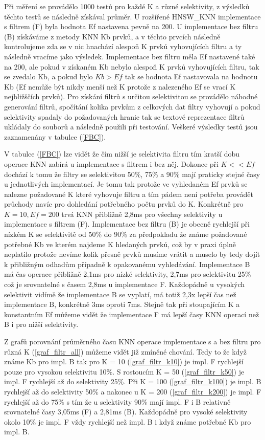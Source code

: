 \documentclass[czech,semestral,dept460,male,csharp,cpdeclaration]{diploma}
\begin{document}
		Při měření se provádělo 1000 testů pro každé K a různé selektivity, z výsledků těchto testů se následně získával průměr. U rozšířené HNSW\_KNN implementace s filtrem (F) byla hodnota Ef nastavena pevně na 200. U implementace bez filtru (B) získáváme z metody KNN Kb prvků, a v těchto prvcích následně kontrolujeme zda se v nic hnachází alespoň K prvků vyhovujících filtru a ty následně vracíme jako výsledek. Implementace bez filtru měla Ef nastavené také na 200, ale pokud v získaném Kb nebylo alespoň K prvků vyhovujících filtru, tak se zvedalo Kb, a pokud bylo $Kb > Ef$ tak se hodnota Ef nastavovala na hodnotu Kb (Ef nemůže být nikdy menší než K protože z nalezeného Ef se vrací K nejbližščích prvků). Pro získání filtrů s určitou selektivitou se provádělo náhodné generování filtrů, spočítání kolika prvkům z celkových dat filtry vyhovují a pokud selektivity spadaly do požadovaných hranic tak se textové reprezentace filtrů ukládaly do souborů a následně použili při testování. Veškeré výsledky testů jsou zaznamenány v tabulce (\ref{FBC}).
		
		V tabulce (\ref{FBC}) lze vidět že čím nižší je selektivita filtru tím kratší dobu operace KNN zabírá u implementace s filtrem i bez něj. Dokonce při $K << Ef$ dochází k tomu že filtry se selektivitou 50\%, 75\% a 90\% mají praticky stejné časy u jednotlivých implementací. Je tomu tak protože ve vyhledaném Ef prvků se nalezne požadované K které vyhovuje filtru a tím pádem není potřeba provádět průchody navíc pro dohledání potřebného počtu prvků do K. Konkrétně pro $K = 10, Ef = 200$ trvá KNN přibližně 2,8ms pro všechny selektivity u implementace s filtrem (F). Implementace bez filtru (B) je obecně rychlejší při nízkém K se selektivitě od 50\% do 90\% za předpokladu že známe požadované potřebné Kb ve kterém najdeme K hledaných prvků, což by v praxi úplně neplatilo protože nevíme kolik přesně prvků musíme vrátit a muselo by tedy dojít k přibližným odhadům případně k opakovanému vyhledávání. Implementace B má čas operace přibližně 2,1ms pro nízké selektivity, 2,7ms pro selektivitu 25\% což je srovnatelné s časem 2,8ms u implementace F. Každopádně u vysokých selektivit vidímě že implementace B se vyplatí, má totiž 2,3x lepší čas než implementace B, konkrétně 3ms oproti 7ms. Stejně tak při stoupajícím K a konstantním Ef můžeme vidět že implementace F má lepší časy KNN operací než B i pro nižší selektivity.
		
		Z grafů porovnání průměrného času KNN operace implementace s a bez filtru pro různá K (\ref{graf_filtr_all}) můžeme vidět již zmíněné chování. Tedy to že když známe Kb pro impl. B tak pro K = 10 (\ref{graf_filtr_k10}) je impl. F rychlejší pouze pro vysokou selektivitu 10\%. S rostoucím K = 50 (\ref{graf_filtr_k50}) je impl. F rychlejší až do selektivity  25\%. Při K = 100 (\ref{graf_filtr_k100}) je impl. B rychlejší až do selektivity 50\% a nakonec u K = 200 (\ref{graf_filtr_k200}) je impl. F rychlejší až do 75\% s tím že u selektivity 90\% mají impl. F i B relativně srovnatelné časy 3,05ms (F) a 2,81ms (B). Každopádně pro vysoké selektivity okolo 10\% je impl. F vždy rychlejší než impl. B i když známe potřebné Kb pro impl. B.
		
\end{document}
